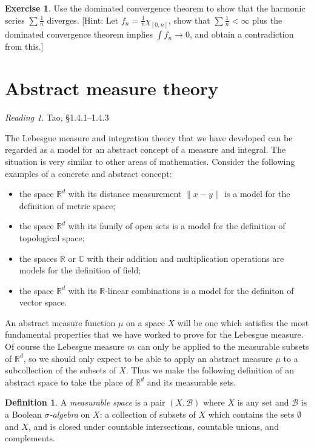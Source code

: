\documentclass[10pt,oneside]{amsbook}
\newcommand{\RR}{{\mathbb R}}
\newcommand{\CC}{{\mathbb C}}
\theoremstyle{definition}
\newtheorem{exerc}{Exercise}[section]
\theoremstyle{plain}
\theoremstyle{definition}
\newtheorem{defn}[thm]{Definition}
\theoremstyle{remark}
\newtheorem*{reading}{Reading}
\numberwithin{equation}{section}
\numberwithin{figure}{section}
\begin{document}
\begin{exerc}
  Use the dominated convergence theorem to show that the harmonic series $\sum\frac1n$ diverges. [Hint: Let $f_n=\frac1n\chi_{[0,n]}$, show that $\sum\frac1n<\infty$ plus the dominated convergence theorem implies $\int f_n\to 0$, and obtain a contradiction from this.]
\end{exerc}

\newpage
\section{Abstract measure theory}

\begin{reading}
  Tao, \S 1.4.1--1.4.3
\end{reading}

The Lebesgue measure and integration theory that we have developed can be regarded as a model for an abstract concept of a measure and integral. The situation is very similar to other areas of mathematics. Consider the following examples of a concrete and abstract concept:
\begin{itemize}
\item the space $\RR^d$ with its distance measurement $\|x-y\|$ is a model for the definition of metric space;
\item the space $\RR^d$ with its family of open sets is a model for the definition of topological space;
\item the spaces $\RR$ or $\CC$ with their addition and multiplication operations are models for the definition of field;
\item the space $\RR^d$ with its $\RR$-linear combinations is a model for the definiton of vector space.
\end{itemize}

An abstract measure function $\mu$ on a space $X$ will be one which satisfies the most fundamental properties that we have worked to prove for the Lebesgue measure. Of course the Lebesgue measure $m$ can only be applied to the measurable subsets of $\RR^d$, so we should only expect to be able to apply an abstract measure $\mu$ to a subcollection of the subsets of $X$. Thus we make the following definition of an abstract space to take the place of $\RR^d$ and its measurable sets.

\begin{defn}
  A \emph{measurable space} is a pair $(X,\mathcal B)$ where $X$ is any set and $\mathcal B$ is a Boolean \emph{$\sigma$-algebra} on $X$: a collection of subsets of $X$ which contains the sets $\emptyset$ and $X$, and is closed under countable intersections, countable unions, and complements.
\end{defn}
\end{document}
